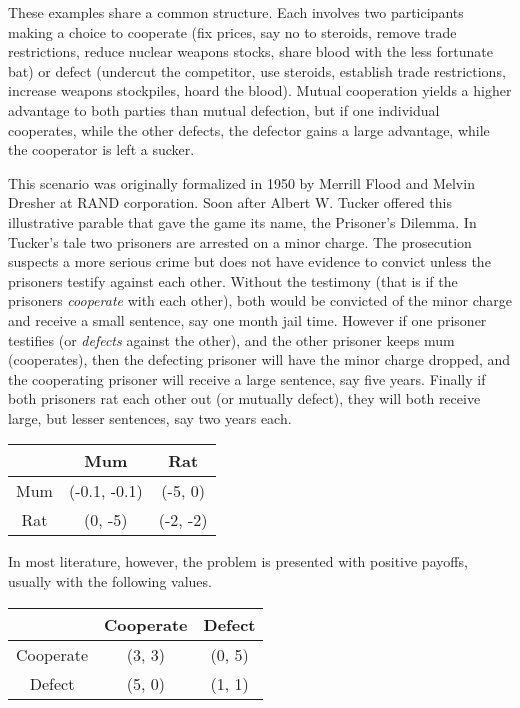These examples share a common structure. Each involves two participants making a choice to cooperate (fix prices, say no to steroids, remove trade restrictions, reduce nuclear weapons stocks, share blood with the less fortunate bat) or defect (undercut the competitor, use steroids, establish trade restrictions, increase weapons stockpiles, hoard the blood). Mutual cooperation yields a higher advantage to both parties than mutual defection, but if one individual cooperates, while the other defects, the defector gains a large advantage, while the cooperator is left a sucker.

This scenario was originally formalized in 1950 by Merrill Flood and Melvin Dresher at RAND corporation. Soon after Albert W. Tucker offered this illustrative parable that gave the game its name, the Prisoner's Dilemma. In Tucker's tale two prisoners are arrested on a minor charge. The prosecution suspects a more serious crime but does not have evidence to convict unless the prisoners testify against each other. Without the testimony (that is if the prisoners \textit{cooperate} with each other), both would be convicted of the minor charge and receive a small sentence, say one month jail time. However if one prisoner testifies (or \textit{defects} against the other), and the other prisoner keeps mum (cooperates), then the defecting prisoner will have the minor charge dropped, and the cooperating prisoner will receive a large sentence, say five years. Finally if both prisoners rat each other out (or mutually defect), they will both receive large, but lesser sentences, say two years each.


\begin{center}
  \begin{tabular}{ | c | c | c | }
    \hline
    & Mum & Rat \\
    \hline
    Mum & (-0.1, -0.1) & (-5, 0) \\ \hline
    Rat & (0, -5) & (-2, -2)  \\ \hline
  \end{tabular}
\end{center}

In most literature, however, the problem is presented with positive payoffs, usually with the following values.

\begin{center}
  \begin{tabular}{ | c | c | c | }
    \hline
    & Cooperate & Defect \\
    \hline
    Cooperate & (3, 3) & (0, 5) \\ \hline
    Defect & (5, 0) & (1, 1)  \\ \hline
  \end{tabular}
\end{center}

